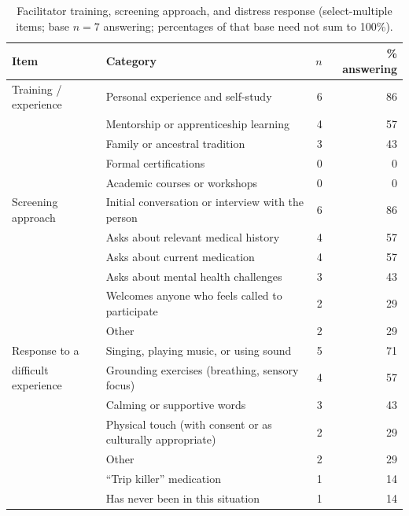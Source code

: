 \documentclass[12pt]{article}
\begin{document}
\begin{table}[htbp]
\centering
\caption{Facilitator training, screening approach, and distress response (select-multiple items; base
$n=7$ answering; percentages of that base need not sum to 100\%).}
\begin{tabular}{p{2.8cm}p{7.2cm}rr}
\toprule
Item & Category & $n$ & \% answering \\
\midrule
Training / experience & Personal experience and self-study & 6 & 86 \\
                      & Mentorship or apprenticeship learning & 4 & 57 \\
                      & Family or ancestral tradition & 3 & 43 \\
                      & Formal certifications & 0 & 0 \\
                      & Academic courses or workshops & 0 & 0 \\
\addlinespace
Screening approach    & Initial conversation or interview with the person & 6 & 86 \\
                      & Asks about relevant medical history & 4 & 57 \\
                      & Asks about current medication & 4 & 57 \\
                      & Asks about mental health challenges & 3 & 43 \\
                      & Welcomes anyone who feels called to participate & 2 & 29 \\
                      & Other & 2 & 29 \\
\addlinespace
Response to a         & Singing, playing music, or using sound & 5 & 71 \\
difficult experience  & Grounding exercises (breathing, sensory focus) & 4 & 57 \\
                      & Calming or supportive words & 3 & 43 \\
                      & Physical touch (with consent or as culturally appropriate) & 2 & 29 \\
                      & Other & 2 & 29 \\
                      & ``Trip killer'' medication & 1 & 14 \\
                      & Has never been in this situation & 1 & 14 \\
\bottomrule
\end{tabular}
\end{table}
\end{document}
